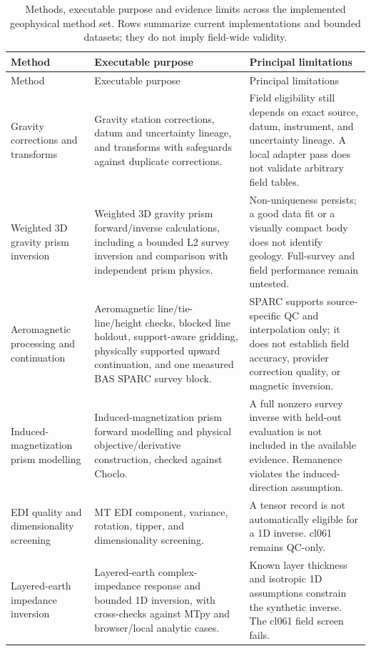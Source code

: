 \begin{center}\small
\begin{longtable}{@{}>{\raggedright\arraybackslash}p{}>{\raggedright\arraybackslash}p{}>{\raggedright\arraybackslash}p{}@{}}
\caption{Methods, executable purpose and evidence limits across the implemented geophysical method set. Rows summarize current implementations and bounded datasets; they do not imply field-wide validity.}\label{tab:methods-limitations}\\
\toprule
Method & Executable purpose & Principal limitations \\
\midrule
\endfirsthead
\toprule
Method & Executable purpose & Principal limitations \\
\midrule
\endhead
Gravity corrections and transforms & Gravity station corrections, datum and uncertainty lineage, and transforms with safeguards against duplicate corrections. & Field eligibility still depends on exact source, datum, instrument, and uncertainty lineage. A local adapter pass does not validate arbitrary field tables. \\
Weighted 3D gravity prism inversion & Weighted 3D gravity prism forward/inverse calculations, including a bounded L2 survey inversion and comparison with independent prism physics. & Non-uniqueness persists; a good data fit or a visually compact body does not identify geology. Full-survey and field performance remain untested. \\
Aeromagnetic processing and continuation & Aeromagnetic line/tie-line/height checks, blocked line holdout, support-aware gridding, physically supported upward continuation, and one measured BAS SPARC survey block. & SPARC supports source-specific QC and interpolation only; it does not establish field accuracy, provider correction quality, or magnetic inversion. \\
Induced-magnetization prism modelling & Induced-magnetization prism forward modelling and physical objective/derivative construction, checked against Choclo. & A full nonzero survey inverse with held-out evaluation is not included in the available evidence. Remanence violates the induced-direction assumption. \\
EDI quality and dimensionality screening & MT EDI component, variance, rotation, tipper, and dimensionality screening. & A tensor record is not automatically eligible for a 1D inverse. cl061 remains QC-only. \\
Layered-earth impedance inversion & Layered-earth complex-impedance response and bounded 1D inversion, with cross-checks against MTpy and browser/local analytic cases. & Known layer thickness and isotropic 1D assumptions constrain the synthetic inverse. The cl061 field screen fails. \\

\end{longtable}
\end{center}
